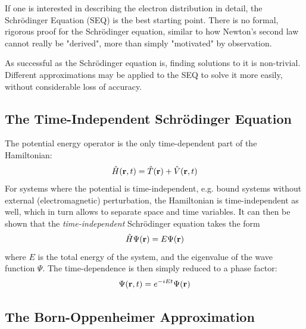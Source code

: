 If one is interested in describing the electron distribution in detail, the Schrödinger Equation (SEQ) is the best starting point. There is no formal, rigorous proof for the Schrödinger equation, similar to how Newton's second law cannot really be "derived", more than simply "motivated" by observation. 

As successful as the Schrödinger equation is, finding solutions to it is non-trivial. Different approximations may be applied to the SEQ to solve it more easily, without considerable loss of accuracy. 

\subsection{The Time-Independent Schrödinger Equation}

The potential energy operator is the only time-dependent part of the Hamiltonian:
\begin{equation}
\hat{H}(\mathbf{r},t) = \hat{T}(\mathbf{r}) + \hat{V}(\mathbf{r},t)
\end{equation} 
\noindent For systems where the potential is time-independent, e.g. bound systems without external (electromagnetic) perturbation, the Hamiltonian is time-independent as well, which in turn allows to separate space and time variables. It can then be shown that the \emph{time-independent} Schrödinger equation takes the form
\begin{equation}
\hat{H}\Psi(\mathbf{r}) = E \Psi(\mathbf{r})
\end{equation}
\noindent where $E$ is the total energy of the system, and the eigenvalue of the wave function $\Psi$. The time-dependence is then simply reduced to a phase factor:
\begin{equation}
\Psi(\mathbf{r},t) = e^{-iEt} \Psi(\mathbf{r})
\end{equation}
\noindent 

\subsection{The Born-Oppenheimer Approximation}

